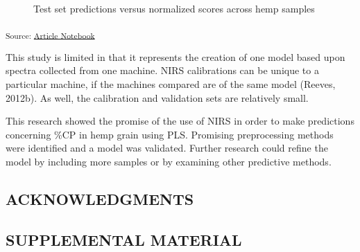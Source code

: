 \documentclass[
]{agujournal2019}
\begin{document}
\label{cell-fig-validation_set_performance}
\begin{figure}[H]


\caption{\label{fig-validation_set_performance}Test set predictions
versus normalized scores across hemp samples}

\end{figure}%

\textsubscript{Source:
\href{https://rvcrawford.github.io/glowing-system/index.qmd.html}{Article
Notebook}}

This study is limited in that it represents the creation of one model
based upon spectra collected from one machine. NIRS calibrations can be
unique to a particular machine, if the machines compared are of the same
model (Reeves, 2012b). As well, the calibration and validation sets are
relatively small.

This research showed the promise of the use of NIRS in order to make
predictions concerning \%CP in hemp grain using PLS. Promising
preprocessing methods were identified and a model was validated. Further
research could refine the model by including more samples or by
examining other predictive methods.

\subsection{ACKNOWLEDGMENTS}\label{acknowledgments}

\subsection{SUPPLEMENTAL MATERIAL}\label{supplemental-material}
\end{document}
